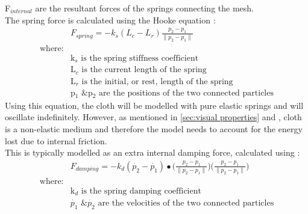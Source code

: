F$_{internal}$ are the resultant forces of the springs connecting the mesh.
\\The spring force is calculated using the Hooke equation \parencite[201]{Parent2012}:
\begin{equation}
\begin{split}
\label{eq:hooke equation}
  &F_{spring} = -k_{s}(L_{c}-L_{r})\frac{p_{2}-p_{1}}{\parallel p_{2}-p_{1}\parallel}
  \\\text{where:}
  \\&\text{k$_{s}$ is the spring stiffness coefficient}
  \\&\text{L$_{c}$ is the current length of the spring}
  \\&\text{L$_{r}$ is the initial, or rest, length of the spring}
  \\&\text{p$_{1}$ \& p$_{2}$ are the positions of the two connected particles}
\end{split}
\end{equation}
Using this equation, the cloth will be modelled with pure elastic springs and will oscillate indefinitely. However, as mentioned in \ref{sec:visual properties} and \textcite{Provot2001}, cloth is a non-elastic medium and therefore the model needs to account for the energy lost due to internal friction.
\\This is typically modelled as an extra internal damping force, calculated using \parencite[201]{Parent2012}:
\begin{equation}
\begin{split}
\label{eq:spring damping}
  &F_{damping} = -k_{d}(\dot{p_{2}}-\dot{p_{1}})\bullet\bigg(\frac{p_{2}-p_{1}}{\parallel p_{2}-p_{1}\parallel}\bigg)\bigg(\frac{p_{2}-p_{1}}{\parallel p_{2}-p_{1}\parallel}\bigg)
  \\\text{where:}
  \\&\text{k$_{d}$ is the spring damping coefficient}
  \\&\text{$\dot{p_{1}}$ \& $\dot{p_{2}}$ are the velocities of the two connected particles}
\end{split}
\end{equation}

